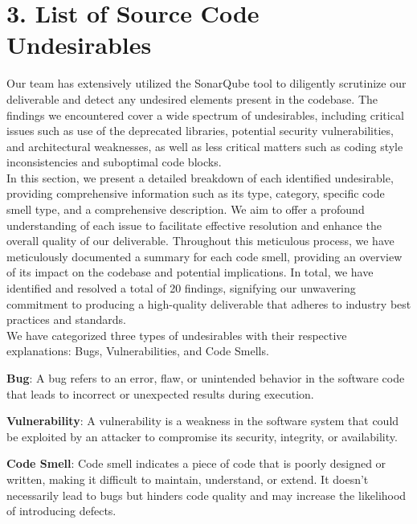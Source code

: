 \documentclass[12pt,letterpaper]{report}
\begin{document}
\section*{3. List of Source Code Undesirables}
\normalsize {
Our team has extensively utilized the SonarQube tool to diligently scrutinize our deliverable and detect any undesired elements present in the codebase. The findings we encountered cover a wide spectrum of undesirables, including critical issues such as use of the deprecated libraries, potential security vulnerabilities, and architectural weaknesses, as well as less critical matters such as coding style inconsistencies and suboptimal code blocks.\\

In this section, we present a detailed breakdown of each identified undesirable, providing comprehensive information such as its type, category, specific code smell type, and a comprehensive description. We aim to offer a profound understanding of each issue to facilitate effective resolution and enhance the overall quality of our deliverable.
Throughout this meticulous process, we have meticulously documented a summary for each code smell, providing an overview of its impact on the codebase and potential implications. In total, we have identified and resolved a total of 20 findings, signifying our unwavering commitment to producing a high-quality deliverable that adheres to industry best practices and standards.\\

We have categorized three types of undesirables with their respective explanations: Bugs, Vulnerabilities, and Code Smells.

\textbf{Bug}: A bug refers to an error, flaw, or unintended behavior in the software code that leads to incorrect or unexpected results during execution.

\textbf{Vulnerability}: A vulnerability is a weakness in the software system that could be exploited by an attacker to compromise its security, integrity, or availability.

\textbf{Code Smell}: Code smell indicates a piece of code that is poorly designed or written, making it difficult to maintain, understand, or extend. It doesn't necessarily lead to bugs but hinders code quality and may increase the likelihood of introducing defects.\\
}
\\
\\
\end{document}
